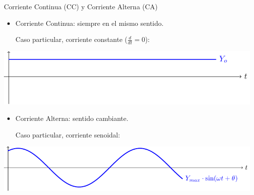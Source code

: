 \documentclass[aspectratio=169, xcolor={usenames,svgnames,dvipsnames}]{beamer}
\begin{document}
\begin{frame}{Corriente Continua (CC) y Corriente Alterna (CA)}
    \begin{itemize}
        \item \alert{Corriente Continua}: siempre en el mismo sentido. 
        
        Caso particular, corriente constante (\(\frac{d}{dt} = 0\)):
    \end{itemize}
    \begin{center}
        \includegraphics[height=0.25\textheight]{../figs/continua.pdf}
    \end{center}
    \vspace{-4mm}
    \begin{itemize}
        \item \alert{Corriente Alterna}: sentido cambiante. 
        
        Caso particular, corriente senoidal:
    \end{itemize}
    \begin{center}
        \includegraphics[height=0.25\textheight]{../figs/sin.pdf}
    \end{center}
\end{frame}

\end{document}
